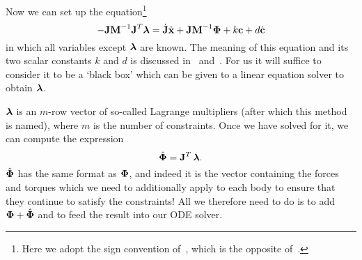 Now we can set up the equation\footnote{Here we adopt the sign convention
of~\cite{BaraffWitkin:97}, which is the opposite of~\cite{Saunders:PhD}.}
\begin{equation}
\label{lagrangeEquation}
-\m{J}\m{M}^{-1}\m{J}^T\ve{\lambda} = \dot{\m{J}}\dot{\ve{x}} +
    \m{J}\m{M}^{-1}\ve{\Phi} + k\ve{c} + d\dot{\ve{c}}
\end{equation}
in which all variables except $\ve{\lambda}$ are known. The meaning of this equation and
its two scalar constants $k$ and $d$ is discussed in~\cite{BaraffWitkin:97}
and~\cite{Saunders:PhD}. For us it will suffice to consider it to be a `black box' which can be
given to a linear equation solver to obtain $\ve{\lambda}$.

$\ve{\lambda}$ is an $m$-row vector of so-called Lagrange multipliers (after which this method
is named), where $m$ is the number of constraints. Once we have solved for it, we can compute
the expression
\begin{equation}
\hat{\ve{\Phi}} = \m{J}^T\,\ve{\lambda}.
\end{equation}
$\hat{\ve{\Phi}}$ has the same format as $\ve{\Phi}$, and indeed it is the vector containing
the forces and torques which we need to additionally apply to each body to ensure that they
continue to satisfy the constraints! All we therefore need to do is to add
$\ve{\Phi} + \hat{\ve{\Phi}}$ and to feed the result into our ODE solver.
